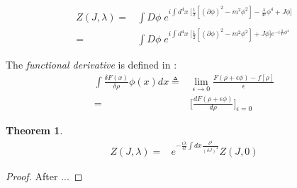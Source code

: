 \documentclass[]{article}
\newtheorem{thm}{Theorem}
\begin{document}
\begin{align*}
	Z(J,\lambda) =& \int D\phi \; e^{i\int d^4x\;\big[\frac{1}{2}[(\partial \phi)^2-m^2\phi^2]-\frac{\lambda}{4!}\phi^4+J\phi\big]}\\
	=& \int D\phi \; e^{i\int d^4x\;\big[\frac{1}{2}[(\partial \phi)^2-m^2\phi^2]+J\phi\big]e^{-i\frac{\lambda}{4!}\phi^4}}
\end{align*}

The \emph{functional derivative} is defined in \cite{enwiki:1034704989}:
\begin{align*}
	\int \frac{\delta F(x)}{\delta \rho} \phi(x) dx \triangleq& \lim_{\epsilon \rightarrow 0} \frac{F(\rho + \epsilon \phi)-f[\rho]}{\epsilon}\\
	=&\bigg[\frac{dF(\rho+\epsilon\phi)}{d\rho}\bigg]_\text{$\epsilon=0$}
\end{align*}


\begin{thm}
	\begin{align*}
		Z(J,\lambda) =&	e^{-\frac{i\lambda}{4!}\int dx \frac{\delta^4}{(\delta J)^4}}Z(J,0)
	\end{align*}
\end{thm}

\begin{proof}
	After \cite{straub2004feynman}...	
\end{proof}




\raggedright

\end{document}
